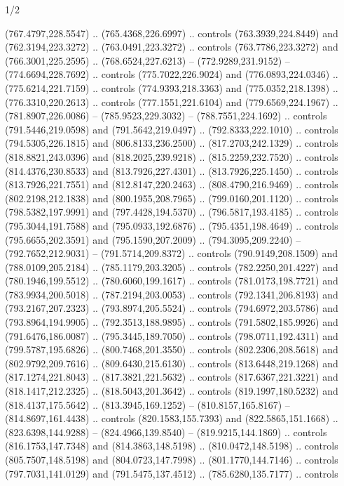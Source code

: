 \begin{flagdescription}{1/2}
\begin{scope}[shift={(2*\flaglength/3-0.25*\rb,0.51333\flagwidth)},scale=0.001715\flagwidth*\stretchfactor]
\begin{scope}[y=-1pt, x=1pt,cm={{1.04354,0.0,0.0,1.01818,(-827,-297)}}]
\begin{scope}[fill=gold]
  (767.4797,228.5547) .. (765.4368,226.6997) .. controls (763.3939,224.8449) and
  (762.3194,223.3272) .. (763.0491,223.3272) .. controls (763.7786,223.3272) and
  (766.3001,225.2595) .. (768.6524,227.6213) -- (772.9289,231.9152) --
  (774.6694,228.7692) .. controls (775.7022,226.9024) and (776.0893,224.0346) ..
  (775.6214,221.7159) .. controls (774.9393,218.3363) and (775.0352,218.1398) ..
  (776.3310,220.2613) .. controls (777.1551,221.6104) and (779.6569,224.1967) ..
  (781.8907,226.0086) -- (785.9523,229.3032) -- (788.7551,224.1692) .. controls
  (791.5446,219.0598) and (791.5642,219.0497) .. (792.8333,222.1010) .. controls
  (794.5305,226.1815) and (806.8133,236.2500) .. (817.2703,242.1329) .. controls
  (818.8821,243.0396) and (818.2025,239.9218) .. (815.2259,232.7520) .. controls
  (814.4376,230.8533) and (813.7926,227.4301) .. (813.7926,225.1450) .. controls
  (813.7926,221.7551) and (812.8147,220.2463) .. (808.4790,216.9469) .. controls
  (802.2198,212.1838) and (800.1955,208.7965) .. (799.0160,201.1120) .. controls
  (798.5382,197.9991) and (797.4428,194.5370) .. (796.5817,193.4185) .. controls
  (795.3044,191.7588) and (795.0933,192.6876) .. (795.4351,198.4649) .. controls
  (795.6655,202.3591) and (795.1590,207.2009) .. (794.3095,209.2240) --
  (792.7652,212.9031) -- (791.5714,209.8372) .. controls (790.9149,208.1509) and
  (788.0109,205.2184) .. (785.1179,203.3205) .. controls (782.2250,201.4227) and
  (780.1946,199.5512) .. (780.6060,199.1617) .. controls (781.0173,198.7721) and
  (783.9934,200.5018) .. (787.2194,203.0053) .. controls (792.1341,206.8193) and
  (793.2167,207.2323) .. (793.8974,205.5524) .. controls (794.6972,203.5786) and
  (793.8964,194.9905) .. (792.3513,188.9895) .. controls (791.5802,185.9926) and
  (791.6476,186.0087) .. (795.3445,189.7050) .. controls (798.0711,192.4311) and
  (799.5787,195.6826) .. (800.7468,201.3550) .. controls (802.2306,208.5618) and
  (802.9792,209.7616) .. (809.6430,215.6130) .. controls (813.6448,219.1268) and
  (817.1274,221.8043) .. (817.3821,221.5632) .. controls (817.6367,221.3221) and
  (818.1417,212.2325) .. (818.5043,201.3642) .. controls (819.1997,180.5232) and
  (818.4137,175.5642) .. (813.3945,169.1252) -- (810.8157,165.8167) --
  (814.8697,161.4438) .. controls (820.1583,155.7393) and (822.5865,151.1668) ..
  (823.6398,144.9288) -- (824.4966,139.8540) -- (819.9215,144.1869) .. controls
  (816.1753,147.7348) and (814.3863,148.5198) .. (810.0472,148.5198) .. controls
  (805.7507,148.5198) and (804.0723,147.7998) .. (801.1770,144.7146) .. controls
  (797.7031,141.0129) and (791.5475,137.4512) .. (785.6280,135.7177) .. controls

\end{scope}
\end{scope}
\end{scope}
\end{flagdescription}
